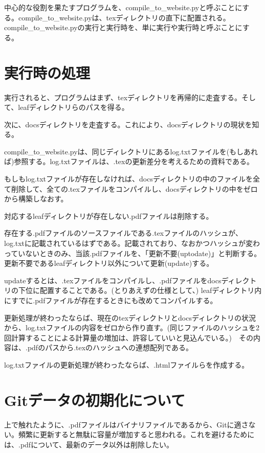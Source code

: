 \documentclass[uplatex,dvipdfmx]{jsarticle} \usepackage{amsmath,amssymb,bm}
\begin{document}
中心的な役割を果たすプログラムを、compile\_to\_website.pyと呼ぶことにする。compile\_to\_website.pyは、texディレクトリの直下に配置される。compile\_to\_website.pyの実行と実行時を、単に実行や実行時と呼ぶことにする。



\section*{実行時の処理}
実行されると、プログラムはまず、texディレクトリを再帰的に走査する。そして、leafディレクトリらのパスを得る。

次に、docsディレクトリを走査する。これにより、docsディレクトリの現状を知る。

compile\_to\_website.pyは、同じディレクトリにあるlog.txtファイルを(もしあれば)参照する。log.txtファイルは、.texの更新差分を考えるための資料である。

もしもlog.txtファイルが存在しなければ、docsディレクトリの中のファイルを全て削除して、全ての.texファイルをコンパイルし、docsディレクトリの中をゼロから構築しなおす。

対応するleafディレクトリが存在しない.pdfファイルは削除する。

存在する.pdfファイルのソースファイルである.texファイルのハッシュが、log.txtに記載されているはずである。記載されており、なおかつハッシュが変わっていないときのみ、当該.pdfファイルを、「更新不要(uptodate)」と判断する。更新不要であるleafディレクトリ以外について更新(update)する。


updateするとは、.texファイルをコンパイルし、.pdfファイルをdocsディレクトリの下位に配置することである。(とりあえずの仕様として、) leafディレクトリ内にすでに.pdfファイルが存在するときにも改めてコンパイルする。

更新処理が終わったならば、現在のtexディレクトリとdocsディレクトリの状況から、log.txtファイルの内容をゼロから作り直す。(同じファイルのハッシュを2回計算することによる計算量の増加は、許容していいと見込んでいる。)　その内容は、.pdfのパスから.texのハッシュへの連想配列である。

log.txtファイルの更新処理が終わったならば、.htmlファイルらを作成する。



\section*{Gitデータの初期化について}
上で触れたように、.pdfファイルはバイナリファイルであるから、Gitに適さない。頻繁に更新すると無駄に容量が増加すると思われる。これを避けるためには、.pdfについて、最新のデータ以外は削除したい。
\end{document}
